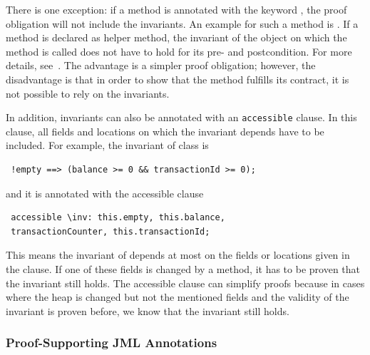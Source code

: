 There is one exception: if a method is annotated with the keyword ,
the proof obligation will not include the invariants. An example for such a method is .
If a method is declared as helper method, the invariant of the object on which the method is called
does not have to hold for its pre- and postcondition. For more details, see~\cite{Weiss2011}.
The advantage is a simpler proof obligation; however, the disadvantage is that
in order to show that the method fulfills its contract, it is not possible
to rely on the invariants.

In addition, invariants can also be annotated with an \texttt{accessible} clause.
In this clause, all fields and locations on which the invariant depends have to be included.
For example, the invariant of class  is 
\begin{verbatim}
 !empty ==> (balance >= 0 && transactionId >= 0);
\end{verbatim} and it is annotated with the accessible clause
\begin{verbatim}
 accessible \inv: this.empty, this.balance, 
 transactionCounter, this.transactionId;
 \end{verbatim}

This means the invariant of  depends at most on the fields or 
locations given in the  clause. If
one of these fields is changed by a method, it has to be proven that the invariant still holds.
The accessible clause can simplify proofs because in cases where the heap is changed 
but not the mentioned fields and the validity of the invariant is proven before, 
we know that the invariant still holds.


\subsubsection{Proof-Supporting JML Annotations}

